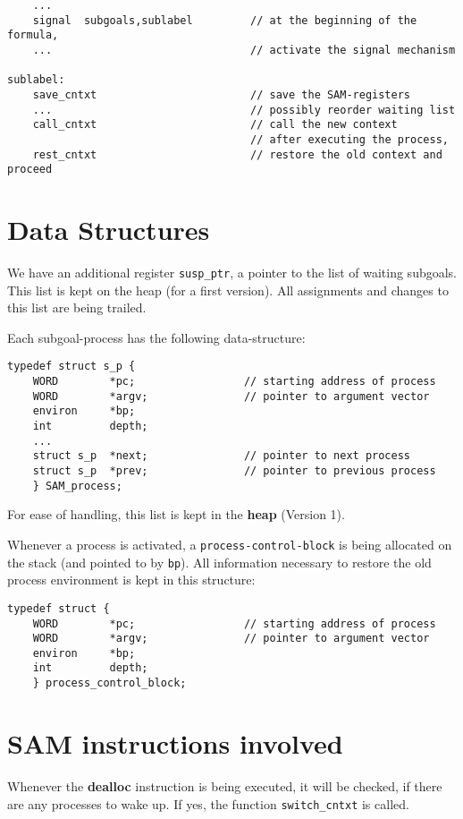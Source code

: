 \begin{verbatim}
    ...
    signal  subgoals,sublabel         // at the beginning of the formula,
    ...                               // activate the signal mechanism
    
sublabel:
    save_cntxt                        // save the SAM-registers
    ...                               // possibly reorder waiting list
    call_cntxt                        // call the new context
                                      // after executing the process,
    rest_cntxt                        // restore the old context and proceed
\end{verbatim}

\section{Data Structures}


We have an additional register {\tt susp\_ptr}, a pointer to the list of waiting
subgoals. This list is kept on the heap (for a first version).
All assignments and changes to this list are being trailed.

Each subgoal-process has the following data-structure:
\begin{verbatim}
typedef struct s_p {
    WORD        *pc;                 // starting address of process
    WORD        *argv;               // pointer to argument vector
    environ     *bp;
    int         depth; 
    ...
    struct s_p  *next;               // pointer to next process
    struct s_p  *prev;               // pointer to previous process
    } SAM_process;
\end{verbatim}

For ease of handling, this list is kept in the {\bf heap} (Version 1).

Whenever a process is activated, a {\tt process-control-block} is being
allocated on the stack (and pointed to by {\tt bp}). All information
necessary to restore the old process environment is kept in this
structure:

\begin{verbatim}
typedef struct {
    WORD        *pc;                 // starting address of process
    WORD        *argv;               // pointer to argument vector
    environ     *bp;
    int         depth; 
    } process_control_block;
\end{verbatim}

\section{SAM instructions involved}
Whenever the {\bf dealloc} instruction is being executed,
it will be checked, if there are any processes to wake up.
If yes, the function {\tt switch\_cntxt} is called.

